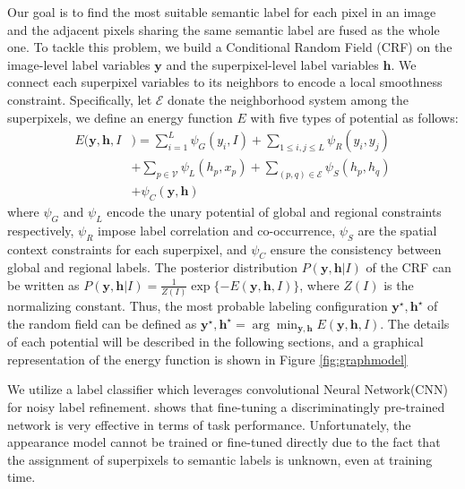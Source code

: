 Our goal is to find the most suitable semantic label for each pixel in an image and the adjacent pixels sharing the same semantic label are fused as the whole one. To tackle this problem, we build a Conditional Random Field (CRF) on the image-level label variables $\boldsymbol{y}$ and the superpixel-level label variables $\boldsymbol{h}$. We connect each superpixel variables to its neighbors to encode a local smoothness constraint. Specifically, let $\mathcal{E}$ donate the neighborhood system among the superpixels, we define an energy function $E$ with five types of potential as follows:
\begin{equation}
    \label{eq:energyfunction}
    \begin{aligned}
        E(\boldsymbol{y},\boldsymbol{h},I&) = \sum_{i=1}^L{\psi_{G}(y_i,I)}
                            + \sum_{1 \le i,j \le L} {\psi_{R}(y_i,y_j)}\\ &+ \sum_{p \in \mathcal{V}}{\psi_{L}(h_p,x_p)}+ \sum_{(p,q) \in \mathcal{E}}{\psi_{S}(h_p,h_q)}\\ &+ \psi_{C}(\boldsymbol{y},\boldsymbol{h})
    \end{aligned}
\end{equation}
where $\psi_G$ and $\psi_{L}$ encode the unary potential of global and regional constraints respectively, $\psi_R$ impose label correlation and co-occurrence, $\psi_S$ are the spatial context constraints for each superpixel, and $\psi_C$ ensure the consistency between global and regional labels.  The posterior distribution $P(\boldsymbol{y},\boldsymbol{h}|I)$ of the CRF can be written as $P(\boldsymbol{y},\boldsymbol{h}|I) = \frac{1}{Z(I)}\exp{\{-E(\boldsymbol{y},\boldsymbol{h},I)\}}$, where $Z(I)$ is the normalizing constant. Thus, the most probable labeling configuration $\boldsymbol{y}^{\star},\boldsymbol{h}^{\star}$ of the random field can be defined as  $\boldsymbol{y}^{\star},\boldsymbol{h}^{\star} = \arg \min_{\boldsymbol{y},\boldsymbol{h}} E(\boldsymbol{y},\boldsymbol{h},I)$. The details of each potential will be described in the following sections, and a graphical representation of the energy function is shown in Figure \ref{fig:graphmodel}

\if
 We utilize a label classifier which leverages convolutional Neural Network(CNN) for noisy label refinement.\cite{agrawal2014analyzing} shows that fine-tuning a discriminatingly pre-trained network is very effective in terms of task performance. Unfortunately, the appearance model cannot be trained or fine-tuned directly due to the fact that the assignment of superpixels to semantic labels is unknown, even at training time.
\fi

